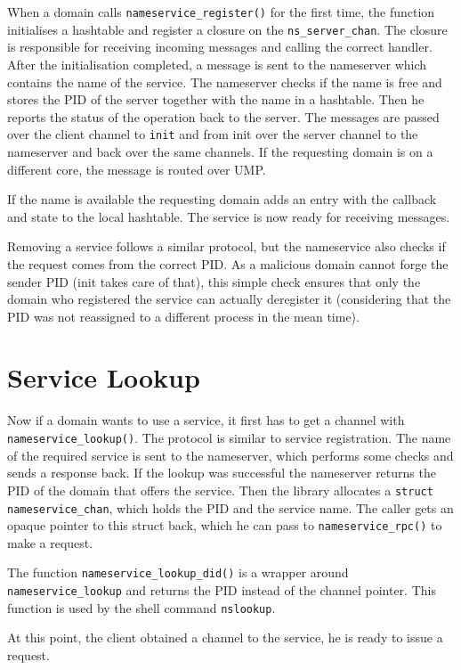 When a domain calls \verb|nameservice_register()| for the first time, the function initialises a hashtable and register a closure
on the \verb|ns_server_chan|. The closure is responsible for receiving incoming messages and calling the correct handler. After
the initialisation completed, a message is sent to the nameserver which contains the name of the service. The nameserver checks
if the name is free and stores the PID of the server together with the name in a hashtable. Then he reports the status of the 
operation back to the server. The messages are passed over the client channel to \verb|init| and from init over the server channel
to the nameserver and back over the same channels. If the requesting domain is on a different core, the message is routed over UMP.

If the name is available the requesting domain adds an entry with the callback and state to the local hashtable. The service is now
ready for receiving messages.

Removing a service follows a similar protocol, but the nameservice also checks if the request comes from the correct PID. As a malicious
domain cannot forge the sender PID (init takes care of that), this simple check ensures that only the domain who registered the service
can actually deregister it (considering that the PID was not reassigned to a different process in the mean time).

\section{Service Lookup}

Now if a domain wants to use a service, it first has to get a channel with \verb|nameservice_lookup()|. The protocol is similar to
service registration. The name of the required service is sent to the nameserver, which performs some checks and sends a response back.
If the lookup was successful the nameserver returns the PID of the domain that offers the service. Then the library allocates a 
\verb|struct nameservice_chan|, which holds the PID and the service name. The caller gets an opaque pointer to this struct back, which
he can pass to \verb|nameservice_rpc()| to make a request.

The function \verb|nameservice_lookup_did()| is a wrapper around \verb|nameservice_lookup| and returns the PID instead of the channel pointer.
This function is used by the shell command \verb|nslookup|.

At this point, the client obtained a channel to the service, he is ready to issue a request.

